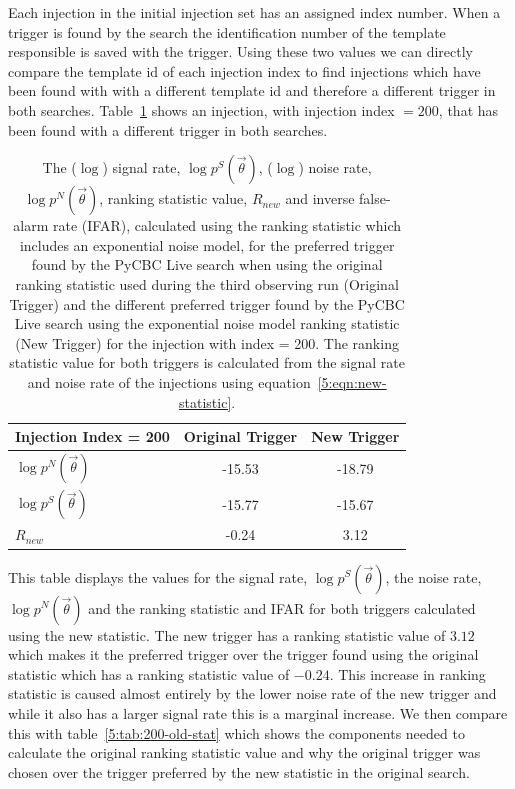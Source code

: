 Each injection in the initial injection set has an assigned index number. When a trigger is found by the search the identification number of the template responsible is saved with the trigger. Using these two values we can directly compare the template id of each injection index to find injections which have been found with with a different template id and therefore a different trigger in both searches. Table~\ref{5:tab:200-new-stat} shows an injection, with injection index $= 200$, that has been found with a different trigger in both searches.
%
\begin{table}[ht]
    \centering
    \begin{tabular}{lcc}
        \toprule
        \textbf{Injection Index = 200} & \textbf{Original Trigger} & \textbf{New Trigger} \\
        \midrule
        $\log p^{N}(\Vec{\theta})$  & -15.53 & -18.79 \\
        $\log p^{S}(\Vec{\theta})$ & -15.77 & -15.67 \\
        $R_{new}$ & -0.24 & 3.12 \\
        \bottomrule
    \end{tabular}
    \caption{The ($\log$) signal rate, $\log p^{S}(\Vec{\theta})$, ($\log$) noise rate, $\log p^{N}(\Vec{\theta})$, ranking statistic value, $R_{new}$ and inverse false-alarm rate (IFAR), calculated using the ranking statistic which includes an exponential noise model, for the preferred trigger found by the PyCBC Live search when using the original ranking statistic used during the third observing run (Original Trigger) and the different preferred trigger found by the PyCBC Live search using the exponential noise model ranking statistic (New Trigger) for the injection with index = 200. The ranking statistic value for both triggers is calculated from the signal rate and noise rate of the injections using equation~\ref{5:eqn:new-statistic}.}

    \label{5:tab:200-new-stat}
\end{table}
%
This table displays the values for the signal rate, $\log p^{S}(\Vec{\theta})$, the noise rate, $\log p^{N}(\Vec{\theta})$ and the ranking statistic and IFAR for both triggers calculated using the new statistic. The new trigger has a ranking statistic value of $3.12$ which makes it the preferred trigger over the trigger found using the original statistic which has a ranking statistic value of $-0.24$. This increase in ranking statistic is caused almost entirely by the lower noise rate of the new trigger and while it also has a larger signal rate this is a marginal increase. We then compare this with table~\ref{5:tab:200-old-stat} which shows the components needed to calculate the original ranking statistic value and why the original trigger was chosen over the trigger preferred by the new statistic in the original search.
